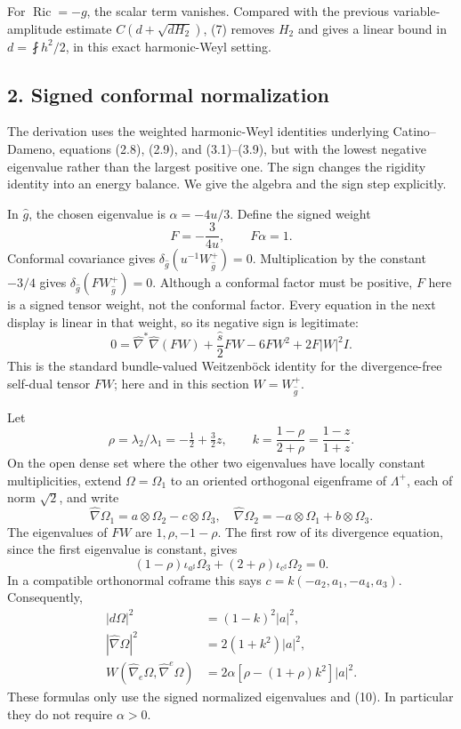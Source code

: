 \documentclass[
  11pt,
]{article}
\begin{document}
For \(\operatorname{Ric}=-g\), the scalar term vanishes. Compared with
the previous variable-amplitude estimate \(C(d+\sqrt{dH_2})\), (7)
removes \(H_2\) and gives a linear bound in \(d=\fint h^2/2\), in this
exact harmonic-Weyl setting.

\hypertarget{signed-conformal-normalization}{%
\subsection{2. Signed conformal
normalization}\label{signed-conformal-normalization}}

The derivation uses the weighted harmonic-Weyl identities underlying
Catino--Dameno, equations (2.8), (2.9), and (3.1)--(3.9), but with the
lowest negative eigenvalue rather than the largest positive one. The
sign changes the rigidity identity into an energy balance. We give the
algebra and the sign step explicitly.

In \(\widehat g\), the chosen eigenvalue is \(\alpha=-4u/3\). Define the
signed weight \[
                 F=-\frac3{4u},\qquad F\alpha=1.
\] Conformal covariance gives
\(\delta_{\widehat g}(u^{-1} W^+_{\widehat g})=0\). Multiplication by
the constant \(-3/4\) gives
\(\delta_{\widehat g}(FW^+_{\widehat g})=0\). Although a conformal
factor must be positive, \(F\) here is a signed tensor weight, not the
conformal factor. Every equation in the next display is linear in that
weight, so its negative sign is legitimate: \[
 0=\widehat\nabla^*\widehat\nabla(FW)
       +\frac{\widehat s}{2}FW-6FW^2+2F|W|^2I.               \tag{8}
\] This is the standard bundle-valued Weitzenböck identity for the
divergence-free self-dual tensor \(FW\); here and in this section
\(W=W^+_{\widehat g}\).

Let \[
 \rho=\lambda_2/\lambda_1=-\tfrac12+\tfrac32z,
 \qquad k=\frac{1-\rho}{2+\rho}=\frac{1-z}{1+z}.
\tag{9}
\] On the open dense set where the other two eigenvalues have locally
constant multiplicities, extend \(\Omega=\Omega_1\) to an oriented
orthogonal eigenframe of \(\Lambda^+\), each of norm \(\sqrt2\), and
write \[
 \widehat\nabla\Omega_1=a\otimes\Omega_2-c\otimes\Omega_3,
 \quad\widehat\nabla\Omega_2=-a\otimes\Omega_1+b\otimes\Omega_3.
\] The eigenvalues of \(FW\) are \(1,\rho,-1-\rho\). The first row of
its divergence equation, since the first eigenvalue is constant, gives
\[
 (1-\rho)\iota_{a^\sharp}\Omega_3
       +(2+\rho)\iota_{c^\sharp}\Omega_2=0.                  \tag{10}
\] In a compatible orthonormal coframe this says
\(c=k(-a_2,a_1,-a_4,a_3)\). Consequently, \[
\begin{split}
 |d\Omega|^2&=(1-k)^2|a|^2,\\
 |\widehat\nabla\Omega|^2&=2(1+k^2)|a|^2,\\
 W(\widehat\nabla_e\Omega,\widehat\nabla^e\Omega)
       &=2\alpha[\rho-(1+\rho)k^2]|a|^2.
\end{split}                                                   \tag{11}
\] These formulas only use the signed normalized eigenvalues and (10).
In particular they do not require \(\alpha>0\).
\end{document}
